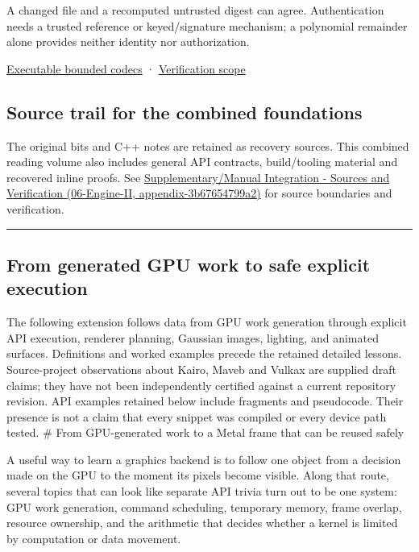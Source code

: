 A changed file and a recomputed untrusted digest can agree. Authentication needs a trusted reference or keyed/signature mechanism; a polynomial remainder alone provides neither identity nor authorization.

\hyperref[appendix-4e2236f53445]{Executable bounded codecs} · \hyperref[appendix-a103e7846d21]{Verification scope}

\subsection{Source trail for the combined foundations}\label{source-trail-for-the-combined-foundations}

The original bits and C++ notes are retained as recovery sources. This combined reading volume also includes general API contracts, build/tooling material and recovered inline proofs. See \href{}{Supplementary/Manual Integration - Sources and Verification (06-Engine-II, appendix-3b67654799a2)} for source boundaries and verification.

\begin{center}\rule{0.5\linewidth}{0.5pt}\end{center}

\subsection{From generated GPU work to safe explicit execution}\label{from-generated-gpu-work-to-safe-explicit-execution}

The following extension follows data from GPU work generation through explicit API execution, renderer planning, Gaussian images, lighting, and animated surfaces. Definitions and worked examples precede the retained detailed lessons. Source-project observations about Kairo, Maveb and Vulkax are supplied draft claims; they have not been independently certified against a current repository revision. API examples retained below include fragments and pseudocode. Their presence is not a claim that every snippet was compiled or every device path tested. \# From GPU-generated work to a Metal frame that can be reused safely

A useful way to learn a graphics backend is to follow one object from a decision made on the GPU to the moment its pixels become visible. Along that route, several topics that can look like separate API trivia turn out to be one system: GPU work generation, command scheduling, temporary memory, frame overlap, resource ownership, and the arithmetic that decides whether a kernel is limited by computation or data movement.

